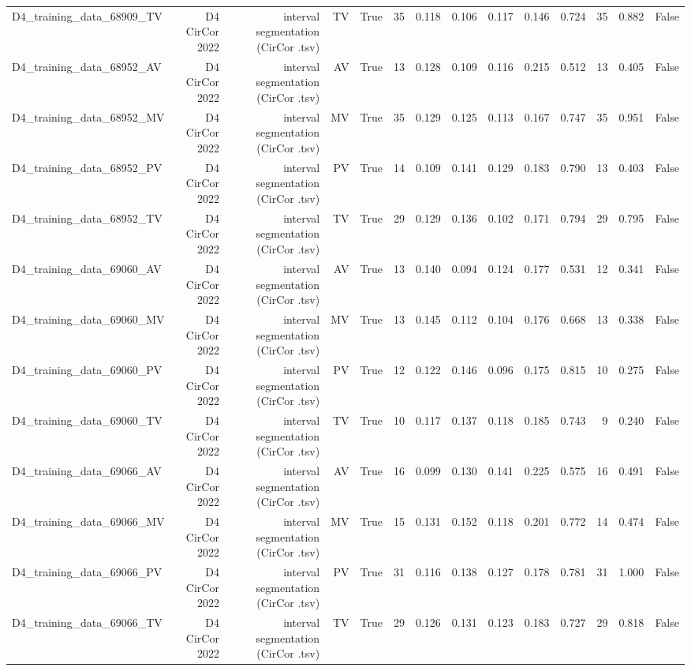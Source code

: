 \begin{table}[htbp]
\begin{tabular}{lrrrrrrrrrrrrr}
    D4\_training\_data\_68909\_TV & D4 CirCor 2022 & interval segmentation (CirCor .tsv) & TV & True & 35 & 0.118 & 0.106 & 0.117 & 0.146 & 0.724 & 35 & 0.882 & False \\
    D4\_training\_data\_68952\_AV & D4 CirCor 2022 & interval segmentation (CirCor .tsv) & AV & True & 13 & 0.128 & 0.109 & 0.116 & 0.215 & 0.512 & 13 & 0.405 & False \\
    D4\_training\_data\_68952\_MV & D4 CirCor 2022 & interval segmentation (CirCor .tsv) & MV & True & 35 & 0.129 & 0.125 & 0.113 & 0.167 & 0.747 & 35 & 0.951 & False \\
    D4\_training\_data\_68952\_PV & D4 CirCor 2022 & interval segmentation (CirCor .tsv) & PV & True & 14 & 0.109 & 0.141 & 0.129 & 0.183 & 0.790 & 13 & 0.403 & False \\
    D4\_training\_data\_68952\_TV & D4 CirCor 2022 & interval segmentation (CirCor .tsv) & TV & True & 29 & 0.129 & 0.136 & 0.102 & 0.171 & 0.794 & 29 & 0.795 & False \\
    D4\_training\_data\_69060\_AV & D4 CirCor 2022 & interval segmentation (CirCor .tsv) & AV & True & 13 & 0.140 & 0.094 & 0.124 & 0.177 & 0.531 & 12 & 0.341 & False \\
    D4\_training\_data\_69060\_MV & D4 CirCor 2022 & interval segmentation (CirCor .tsv) & MV & True & 13 & 0.145 & 0.112 & 0.104 & 0.176 & 0.668 & 13 & 0.338 & False \\
    D4\_training\_data\_69060\_PV & D4 CirCor 2022 & interval segmentation (CirCor .tsv) & PV & True & 12 & 0.122 & 0.146 & 0.096 & 0.175 & 0.815 & 10 & 0.275 & False \\
    D4\_training\_data\_69060\_TV & D4 CirCor 2022 & interval segmentation (CirCor .tsv) & TV & True & 10 & 0.117 & 0.137 & 0.118 & 0.185 & 0.743 & 9 & 0.240 & False \\
    D4\_training\_data\_69066\_AV & D4 CirCor 2022 & interval segmentation (CirCor .tsv) & AV & True & 16 & 0.099 & 0.130 & 0.141 & 0.225 & 0.575 & 16 & 0.491 & False \\
    D4\_training\_data\_69066\_MV & D4 CirCor 2022 & interval segmentation (CirCor .tsv) & MV & True & 15 & 0.131 & 0.152 & 0.118 & 0.201 & 0.772 & 14 & 0.474 & False \\
    D4\_training\_data\_69066\_PV & D4 CirCor 2022 & interval segmentation (CirCor .tsv) & PV & True & 31 & 0.116 & 0.138 & 0.127 & 0.178 & 0.781 & 31 & 1.000 & False \\
    D4\_training\_data\_69066\_TV & D4 CirCor 2022 & interval segmentation (CirCor .tsv) & TV & True & 29 & 0.126 & 0.131 & 0.123 & 0.183 & 0.727 & 29 & 0.818 & False \\

\end{tabular}
\end{table}
